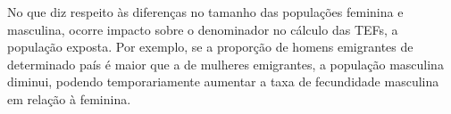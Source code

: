 No que diz respeito às diferenças no tamanho das populações feminina e masculina, ocorre impacto sobre o denominador no cálculo das TEFs, a população exposta. Por exemplo, se a proporção de homens emigrantes de determinado país é maior que a de mulheres emigrantes, a população masculina diminui, podendo temporariamente aumentar a taxa de fecundidade masculina em relação à feminina. 



\begin{comment}

A combinação de diferentes idades entre mães e pais com a variação nos tamanhos das coortes produz discrepâncias na fecundidade de homens e mulheres porque, se homens e mulheres forem de coortes diferentes e houver variação no tamanho das coortes, o denominador das taxas masculinas e femininas podem diferir. \citeonline{schoumaker2017measuring}, por exemplo, demonstrou em países com altas taxas de crescimento populacional a TFTM cresce mais do que a TFTF, já que os pais costumam vir de coortes menores e de idade mais avançadas do que suas parceiras. 




   -----------------------
     A nossa segunda conclusão principal é que as diferenças de idade entre pais e mães permaneceram constantes ou diminuíram na maioria dos países do nosso estudo, exceto nos países da Europa Oriental e na Alemanha Oriental. Embora esta tendência geral esteja em linha com as expectativas baseadas nas teorias de género, as diferenças que existem actualmente entre os países parecem ser afectadas por mais factores do que apenas diferenças nos níveis de igualdade de género.
    -------------- 


Razão de sexo\footnote{Expressa pelo número de homens para cada grupo de
100 mulheres, na população residente em determinado espaço geográfico, no ano
considerado \cite{rede2002indicadores}.}


encontraram indícios de que as mudanças na razão entre a TFTM e a TFTF são governadas pelas diferenças de idade entre parceiros e em mudanças no comportamento reprodutivo, como adiamento da paternidade e maternidade. Analisaram dados de 17 países de renda alta, no intervalo entre 1968 a 2016 ou 1980 a 2016, para a maioria dos países, e chegaram a algumas conclusões interessantes. Segundo os autores,\textbf{o adiamento da maternidade e da paternidade são fatores...}


From a demographic perspective, such disparities can be driven by three main factors: first, differences in the population sizes of males and females, i.e., in the sex ratio, which can affect both TFR and CFR differences; second, age differences between mothers and fathers in interplay with variation in cohort sizes (affecting the TFR and the CFR); and, third, gender differences in tempo effects, which can impact gender differences in the TFR, but not in the CFR.




\end{comment}
